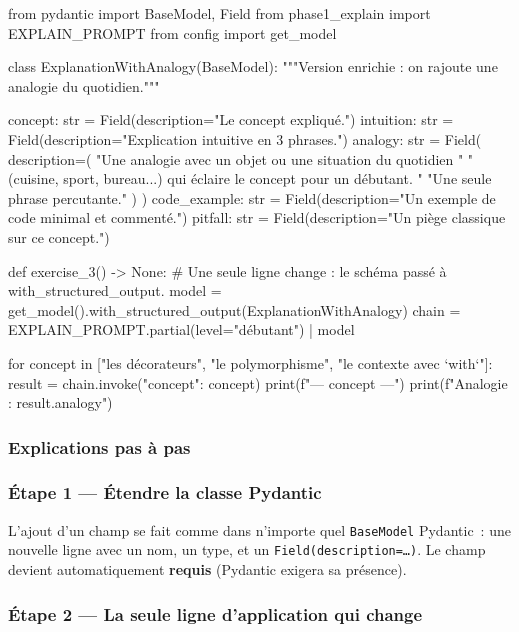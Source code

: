 \documentclass[11pt,a4paper]{article}
\begin{document}
\begin{pythoncode}
from pydantic import BaseModel, Field
from phase1_explain import EXPLAIN_PROMPT
from config import get_model


class ExplanationWithAnalogy(BaseModel):
    """Version enrichie : on rajoute une analogie du quotidien."""

    concept: str = Field(description="Le concept expliqué.")
    intuition: str = Field(description="Explication intuitive en 3 phrases.")
    analogy: str = Field(
        description=(
            "Une analogie avec un objet ou une situation du quotidien "
            "(cuisine, sport, bureau...) qui éclaire le concept pour un débutant. "
            "Une seule phrase percutante."
        )
    )
    code_example: str = Field(description="Un exemple de code minimal et commenté.")
    pitfall: str = Field(description="Un piège classique sur ce concept.")


def exercise_3() -> None:
    # Une seule ligne change : le schéma passé à with_structured_output.
    model = get_model().with_structured_output(ExplanationWithAnalogy)
    chain = EXPLAIN_PROMPT.partial(level="débutant") | model

    for concept in ["les décorateurs", "le polymorphisme", "le contexte avec `with`"]:
        result = chain.invoke({"concept": concept})
        print(f"\n--- {concept} ---")
        print(f"Analogie : {result.analogy}")
\end{pythoncode}

\subsubsection{Explications pas à pas}

\subsubsection*{Étape 1 — Étendre la classe Pydantic}

L'ajout d'un champ se fait comme dans n'importe quel \texttt{BaseModel}
Pydantic~: une nouvelle ligne avec un nom, un type, et un
\texttt{Field(description=\dots)}. Le champ devient automatiquement
\textbf{requis} (Pydantic exigera sa présence).

\subsubsection*{Étape 2 — La seule ligne d'application qui change}
\end{document}
